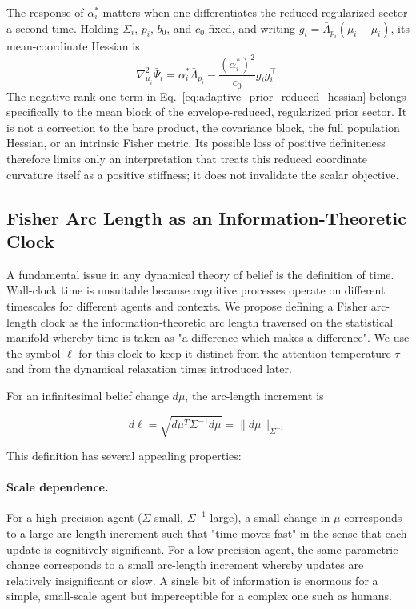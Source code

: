 \documentclass[12pt]{article}
\begin{document}
The response of $\alpha_i^*$ matters when one differentiates the reduced regularized sector a second time. Holding $\Sigma_i$, $p_i$, $b_0$, and $c_0$ fixed, and writing $g_i=\bar\Lambda_{p_i}(\mu_i-\bar\mu_i)$, its mean-coordinate Hessian is
\begin{equation}
\nabla_{\mu_i}^2\bar\Psi_i
=\alpha_i^*\bar\Lambda_{p_i}
-\frac{(\alpha_i^*)^2}{c_0}g_ig_i^{\top}.
\label{eq:adaptive_prior_reduced_hessian}
\end{equation}
The negative rank-one term in Eq.~\eqref{eq:adaptive_prior_reduced_hessian} belongs specifically to the mean block of the envelope-reduced, regularized prior sector. It is not a correction to the bare product, the covariance block, the full population Hessian, or an intrinsic Fisher metric. Its possible loss of positive definiteness therefore limits only an interpretation that treats this reduced coordinate curvature itself as a positive stiffness; it does not invalidate the scalar objective.

\subsection{Fisher Arc Length as an Information-Theoretic Clock}
\label{sec:proper_time}

A fundamental issue in any dynamical theory of belief is the definition of time. Wall-clock time is unsuitable because cognitive processes operate on different timescales for different agents and contexts. We propose defining a Fisher arc-length clock as the information-theoretic arc length traversed on the statistical manifold whereby time is taken as "a difference which makes a difference". We use the symbol $\ell$ for this clock to keep it distinct from the attention temperature $\tau$ and from the dynamical relaxation times introduced later.

For an infinitesimal belief change $d\mu$, the arc-length increment is

\begin{equation}
\boxed{d\ell = \sqrt{d\mu^T \Sigma^{-1} d\mu} = \|d\mu\|_{\Sigma^{-1}}}
\end{equation}

This definition has several appealing properties:

\paragraph{Scale dependence.} For a high-precision agent ($\Sigma$ small, $\Sigma^{-1}$ large), a small change in $\mu$ corresponds to a large arc-length increment such that "time moves fast" in the sense that each update is cognitively significant. For a low-precision agent, the same parametric change corresponds to a small arc-length increment whereby updates are relatively insignificant or slow. A single bit of information is enormous for a simple, small-scale agent but imperceptible for a complex one such as humans.
\end{document}
